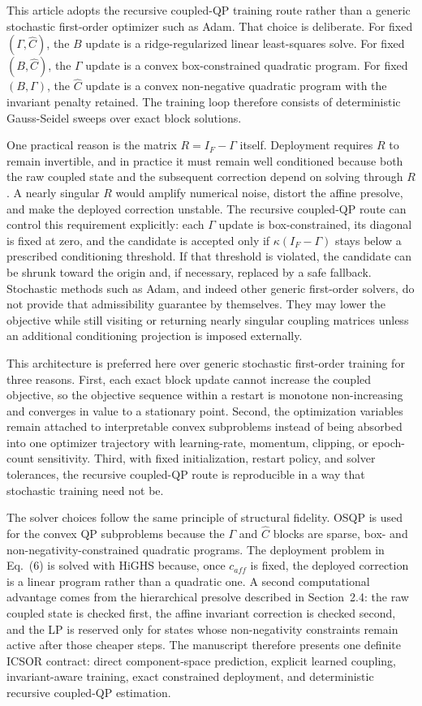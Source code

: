 \documentclass[11pt]{article}
\begin{document}
This article adopts the recursive coupled-QP training route rather than a generic stochastic first-order optimizer such as Adam. That choice is deliberate. For fixed $(\Gamma, \widehat{C})$, the $B$ update is a ridge-regularized linear least-squares solve. For fixed $(B, \widehat{C})$, the $\Gamma$ update is a convex box-constrained quadratic program. For fixed $(B, \Gamma)$, the $\widehat{C}$ update is a convex non-negative quadratic program with the invariant penalty retained. The training loop therefore consists of deterministic Gauss-Seidel sweeps over exact block solutions.

One practical reason is the matrix $R = I_F - \Gamma$ itself. Deployment requires $R$ to remain invertible, and in practice it must remain well conditioned because both the raw coupled state and the subsequent correction depend on solving through $R$. A nearly singular $R$ would amplify numerical noise, distort the affine presolve, and make the deployed correction unstable. The recursive coupled-QP route can control this requirement explicitly: each $\Gamma$ update is box-constrained, its diagonal is fixed at zero, and the candidate is accepted only if $\kappa(I_F - \Gamma)$ stays below a prescribed conditioning threshold. If that threshold is violated, the candidate can be shrunk toward the origin and, if necessary, replaced by a safe fallback. Stochastic methods such as Adam, and indeed other generic first-order solvers, do not provide that admissibility guarantee by themselves. They may lower the objective while still visiting or returning nearly singular coupling matrices unless an additional conditioning projection is imposed externally.

This architecture is preferred here over generic stochastic first-order training for three reasons. First, each exact block update cannot increase the coupled objective, so the objective sequence within a restart is monotone non-increasing and converges in value to a stationary point. Second, the optimization variables remain attached to interpretable convex subproblems instead of being absorbed into one optimizer trajectory with learning-rate, momentum, clipping, or epoch-count sensitivity. Third, with fixed initialization, restart policy, and solver tolerances, the recursive coupled-QP route is reproducible in a way that stochastic training need not be.

The solver choices follow the same principle of structural fidelity. OSQP is used for the convex QP subproblems because the $\Gamma$ and $\widehat{C}$ blocks are sparse, box- and non-negativity-constrained quadratic programs. The deployment problem in Eq.~(6) is solved with HiGHS because, once $c_{aff}$ is fixed, the deployed correction is a linear program rather than a quadratic one. A second computational advantage comes from the hierarchical presolve described in Section~2.4: the raw coupled state is checked first, the affine invariant correction is checked second, and the LP is reserved only for states whose non-negativity constraints remain active after those cheaper steps. The manuscript therefore presents one definite ICSOR contract: direct component-space prediction, explicit learned coupling, invariant-aware training, exact constrained deployment, and deterministic recursive coupled-QP estimation.
\end{document}
